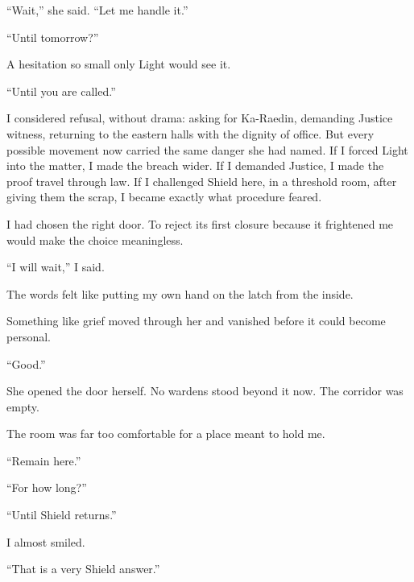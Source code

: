 ``Wait,'' she said. ``Let me handle it.''\par

``Until tomorrow?''\par

A hesitation so small only Light would see it.\par

``Until you are called.''\par

I considered refusal, without drama: asking for Ka-Raedin, demanding Justice witness, returning to the eastern halls with the dignity of office. But every possible movement now carried the same danger she had named. If I forced Light into the matter, I made the breach wider. If I demanded Justice, I made the proof travel through law. If I challenged Shield here, in a threshold room, after giving them the scrap, I became exactly what procedure feared.\par

I had chosen the right door. To reject its first closure because it frightened me would make the choice meaningless.\par

``I will wait,'' I said.\par

The words felt like putting my own hand on the latch from the inside.\par

Something like grief moved through her and vanished before it could become personal.\par

``Good.''\par

She opened the door herself. No wardens stood beyond it now. The corridor was empty.\par

The room was far too comfortable for a place meant to hold me.\par

``Remain here.''\par

``For how long?''\par

``Until Shield returns.''\par

I almost smiled.\par

``That is a very Shield answer.''\par


